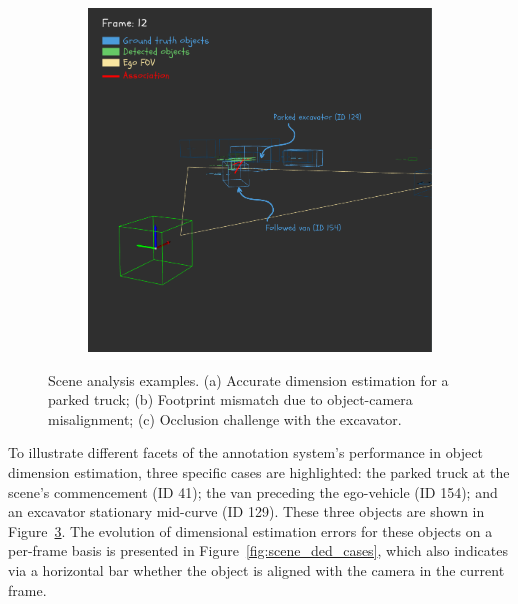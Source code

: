 \begin{figure}[!ht]
\begin{subfigure}[b]{0.32\textwidth}
        \caption{}
        \label{fig:scene_open3d_cases_b}
    \end{subfigure}
    \hfill
    \begin{subfigure}[b]{0.32\textwidth}
        \includegraphics[width=\textwidth]{images/experiments/evaluation_frames/3d_evaluation_frame_12_excavator_problem_canva.png}
        \caption{}
        \label{fig:scene_open3d_cases_c}
    \end{subfigure}
    \caption{Scene analysis examples. (a) Accurate dimension estimation for a parked truck; (b) Footprint mismatch due to object-camera misalignment; (c) Occlusion challenge with the excavator.}
    \label{fig:scene_open3d_cases}
\end{figure}

To illustrate different facets of the annotation system's performance in object dimension estimation, three specific cases are highlighted: the parked truck at the scene's commencement (ID 41); the van preceding the ego-vehicle (ID 154); and an excavator stationary mid-curve (ID 129). These three objects are shown in Figure~\ref{fig:scene_open3d_cases}. The evolution of dimensional estimation errors for these objects on a per-frame basis is presented in Figure~\ref{fig:scene_ded_cases}, which also indicates via a horizontal bar whether the object is aligned with the camera in the current frame.


